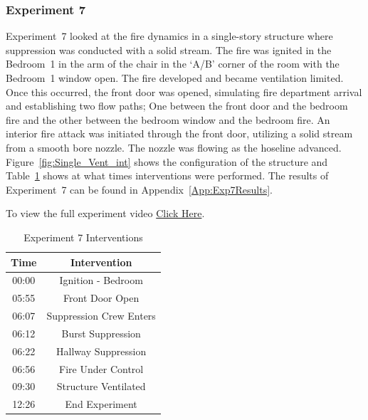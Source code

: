 \documentclass[12pt,oneside]{book}
\begin{document}
\FloatBarrier
\clearpage

\subsubsection{Experiment 7}
Experiment~7 looked at the fire dynamics in a single-story structure where suppression was conducted with a solid stream. The fire was ignited in the Bedroom~1 in the arm of the chair in the `A/B' corner of the room with the Bedroom~1 window open. The fire developed and became ventilation limited. Once this occurred, the front door was opened, simulating fire department arrival and establishing two flow paths; One between the front door and the bedroom fire and the other between the bedroom window and the bedroom fire. An interior fire attack was initiated through the front door, utilizing a solid stream from a smooth bore nozzle. The nozzle was flowing as the hoseline advanced. Figure~\ref{fig:Single_Vent_int} shows the configuration of the structure and Table~\ref{Table:Exp7Interventions} shows at what times interventions were performed. The results of Experiment~7 can be found in Appendix~\ref{App:Exp7Results}. 

To view the full experiment video \href{https://player.vimeo.com/video/170513517?autoplay=1}{Click Here}.

\begin{table}[H]
	\centering
	\caption{Experiment 7 Interventions}
	\begin{tabular}{|c|c|} 
		\hline
		Time & Intervention \\ \hline \hline
		00:00 & Ignition - Bedroom \\ \hline
		05:55 & Front Door Open \\ \hline
		06:07 & Suppression Crew Enters\\ \hline
		06:12 & Burst Suppression \\ \hline 
		06:22 & Hallway Suppression \\ \hline
		06:56 & Fire Under Control 	\\ \hline
		09:30 & Structure Ventilated \\ \hline
		12:26 & End Experiment\\ \hline
	\end{tabular}
	\label{Table:Exp7Interventions}
\end{table}

\FloatBarrier
\clearpage
\end{document}
